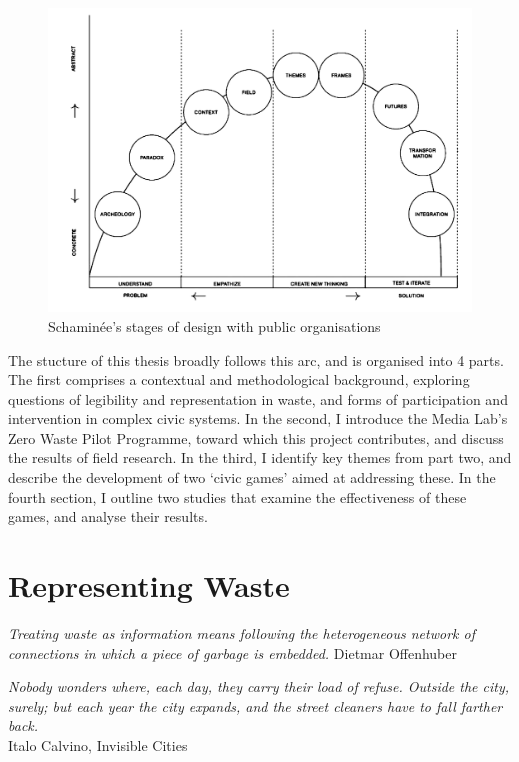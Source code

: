 \documentclass[nofonts,nols,justified,nobib]{tufte-book}
\begin{document}
\begin{figure}
\includegraphics[width=\textwidth]{img/1/design-stages}
\caption{Schamin\'ee's stages of design with public organisations \cite{schaminee_designing_2018}}
\end{figure}

The stucture of this thesis broadly follows this arc, and is organised into 4 parts. The first comprises a contextual and methodological background, exploring questions of legibility and representation in waste, and forms of participation and intervention in complex civic systems. In the second, I introduce the Media Lab's Zero Waste Pilot Programme, toward which this project contributes, and discuss the results of field research. In the third, I identify key themes from part two, and describe the development of two `civic games' aimed at addressing these. In the fourth section, I outline two studies that examine the effectiveness of these games, and analyse their results.

\chapter{Representing Waste}

\begin{flushright}
\emph{Treating waste as information means following the heterogeneous network of connections in which a piece of garbage is embedded.} \cite{offenhuber_waste_2017}
Dietmar Offenhuber
\end{flushright}

\begin{flushright}
\emph{Nobody wonders where, each day, they carry their load of refuse. Outside the city, surely; but each year the city expands, and the street cleaners have to fall farther back.}\cite{calvino_invisible_1974}\\
Italo Calvino, Invisible Cities
\end{flushright}
\end{document}
